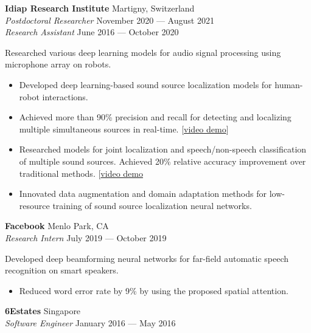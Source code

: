 \documentclass[a4paper,9pt]{extarticle} %
\begin{document}
\textbf{Idiap Research Institute}  \hfill Martigny, Switzerland \\
\textit{Postdoctoral Researcher} \hfill November 2020 --- August 2021 \\
\textit{Research Assistant} \hfill June 2016 --- October 2020%
\vspace{-.5\parskip}

Researched various deep learning models for audio signal processing using microphone array on robots.
\vspace{-.9\parskip}
\begin{itemize}[nosep]
  \item Developed deep learning-based sound source localization models for human-robot interactions. 
  \item Achieved more than 90\% precision and recall for detecting and localizing multiple simultaneous sources in real-time. [\href{https://www.youtube.com/watch?v=_4EwuVlE_pU}{video demo}]
  \item Researched models for joint localization and speech/non-speech classification of multiple sound sources. Achieved 20\% relative accuracy improvement over traditional methods. [\href{https://www.youtube.com/watch?v=O7bQvg03RTc}{video demo}
  \item Innovated data augmentation and domain adaptation methods for low-resource training of sound source localization neural networks.
\end{itemize}


\textbf{Facebook}  \hfill Menlo Park, CA\\
\textit{Research Intern} \hfill July 2019 --- October 2019%
\vspace{-.5\parskip}

Developed deep beamforming neural networks for far-field automatic speech recognition on smart speakers.
\vspace{-.9\parskip}
\begin{itemize}[nosep]
  \item Reduced word error rate by 9\% by using the proposed spatial attention.
\end{itemize}


\textbf{6Estates}  \hfill Singapore \\
\textit{Software Engineer} \hfill January 2016 --- May 2016%
\vspace{-.5\parskip}
\end{document}
